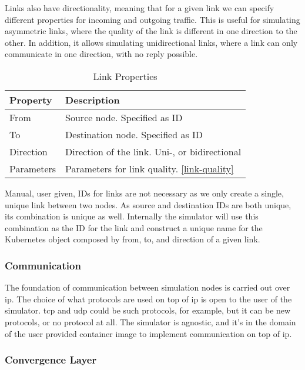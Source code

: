 Links also have directionality, meaning that for a given link we can specify different properties for incoming and outgoing traffic.
This is useful for simulating asymmetric links, where the quality of the link is different in one direction to the other. In addition, it allows simulating unidirectional links, where a link can only communicate in one direction, with no reply possible.

\begin{table}[H]
  \centering
  \begin{tabular}{ l|l }
    \label{table:properties-link}
    Property   & Description                                     \\
    \hline
    From       & Source node. Specified as ID                    \\
    To         & Destination node. Specified as ID               \\
    Direction  & Direction of the link. Uni-, or bidirectional   \\
    Parameters & Parameters for link quality. \ref{link-quality} \\
  \end{tabular}
  \caption{Link Properties}
\end{table}

Manual, user given, IDs for links are not necessary as we only create a single, unique link between two nodes. As source and destination IDs are both unique, its combination is unique as well. Internally the simulator will use this combination as the ID for the link and construct a unique name for the Kubernetes object composed by from, to, and direction of a given link.

\subsubsection{Communication}

The foundation of communication between simulation nodes is carried out over \ac{ip}. The choice of what protocols are used on top of \ac{ip} is open to the user of the simulator. \ac{tcp} and \ac{udp} could be such protocols, for example, but it can be new protocols, or no protocol at all. The simulator is agnostic, and it's in the domain of the user provided container image to implement communication on top of \ac{ip}.

\subsubsection{Convergence Layer}

